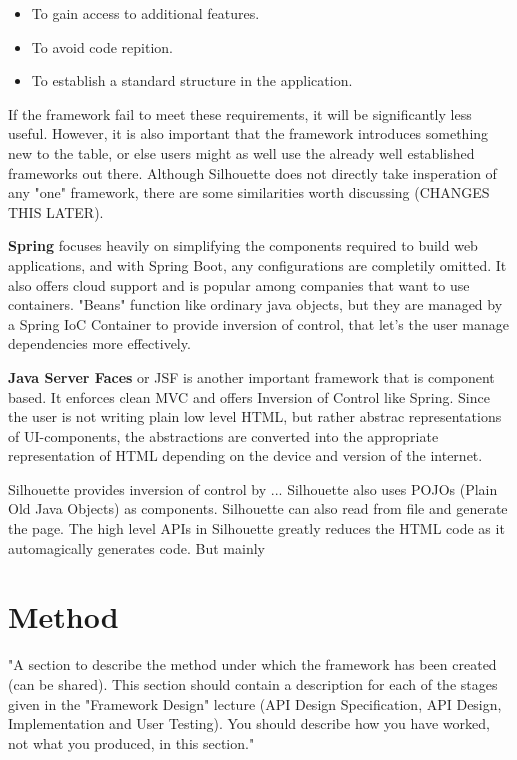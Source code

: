 \documentclass[12pt]{article}
\begin{document}
\begin{itemize}
    \item To gain access to additional features.
    \item To avoid code repition.
    \item To establish a standard structure in the application.
\end{itemize}

If the framework fail to meet these requirements, it will be significantly less useful. However, it is also important that the framework introduces something new to the table, or else users might as well use the already well established frameworks out there. Although Silhouette does not directly take insperation of any "one" framework, there are some similarities worth discussing (CHANGES THIS LATER).

\textbf{Spring} focuses heavily on simplifying the components required to build web applications, and with Spring Boot, any configurations are completily omitted. It also offers cloud support and is popular among companies that want to use containers. "Beans" function like ordinary java objects, but they are managed by a Spring IoC Container to provide inversion of control, that let's the user manage dependencies more effectively.

\textbf{Java Server Faces} or JSF is another important framework that is component based. It enforces clean MVC and offers Inversion of Control like Spring. Since the user is not writing plain low level HTML, but rather abstrac representations of UI-components, the abstractions are converted into the appropriate representation of HTML depending on the device and version of the internet.

Silhouette provides inversion of control by ... Silhouette also uses POJOs (Plain Old Java Objects) as components. Silhouette can also read from file and generate the page. The high level APIs in Silhouette greatly reduces the HTML code as it automagically generates code. But mainly

\section{Method}
"A section to describe the method under which the framework has been created (can be shared). This section should contain a description for each of the stages given in the "Framework Design" lecture (API Design Specification, API Design, Implementation and User Testing). 
You should describe how you have worked, not what you produced, in this section."
\end{document}
